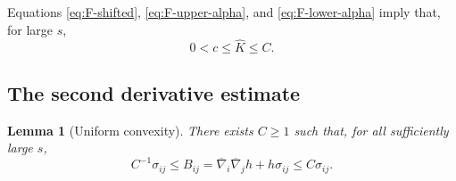 \documentclass[11pt, reqno]{amsart}
\newtheorem{lemma}[theorem]{Lemma}
\theoremstyle{remark}
\theoremstyle{definition}
\numberwithin{equation}{section}
\begin{document}
Equations \eqref{eq:F-shifted},
\eqref{eq:F-upper-alpha}, and \eqref{eq:F-lower-alpha} imply that, for large $s$,
\begin{equation*}
        0<c\le\widehat K\le C.
\end{equation*}


\subsection{The second derivative estimate}


\begin{lemma}[Uniform convexity]\label{thm:C2-alpha}
There exists $C\ge 1$ such that, for all sufficiently large $s$,
\begin{equation}\label{eq:B-two-sided}
        C^{-1}\sigma_{ij}
        \le B_{ij}=\overline{\nabla}_i\overline{\nabla}_jh+h\sigma_{ij}
        \le C\sigma_{ij}.
\end{equation}
\end{lemma}
\end{document}
